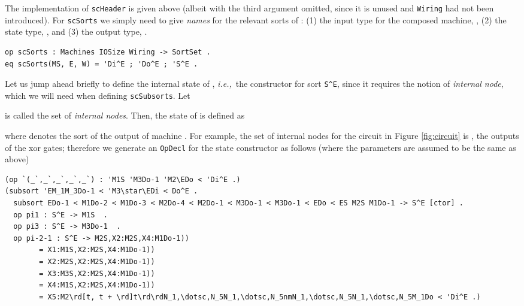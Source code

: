 \documentclass[copyright,creativecommons]{eptcs}
\newcommand{\ie}{\textit{i.e.,}}
\DeclareMathOperator{\rd}{rd}
\begin{document}
The implementation of {\tt scHeader} is given above (albeit with the third
argument omitted, since it is unused and {\tt Wiring} had not been introduced).
For {\tt scSorts} we simply need to give \emph{names} for the relevant sorts of
: (1) the input type for the composed machine, , (2) the state
type, , and (3) the output type, .

\begin{center}
\begin{small}
\begin{boxedminipage}{0.60\textwidth}
\begin{verbatim}
op scSorts : Machines IOSize Wiring -> SortSet .
eq scSorts(MS, E, W) = 'Di^E ; 'Do^E ; 'S^E .
\end{verbatim}
\end{boxedminipage}
\end{small}
\end{center}

Let us jump ahead briefly to define the internal state of , \ie\ the
constructor for sort {\tt S\^{}E}, since it requires the notion of
\emph{internal node}, which we will need when defining {\tt scSubsorts}.
Let 

 is called the set of \emph{internal nodes}. Then, the state of  is
defined as

where  denotes the sort of the  output of machine .
For example, the set of internal nodes for the circuit in Figure
\ref{fig:circuit} is , the outputs of the xor gates;
therefore we generate an {\tt OpDecl} for the state constructor as follows
(where the parameters are assumed to be the same as above)

\begin{center}
\begin{small}
\begin{boxedminipage}{0.95\textwidth}
\begin{verbatim}
(op `(_`,_`,_`,_`,_`) : 'M1S 'M3Do-1 'M2\EDo < 'Di^E .)
(subsort 'EM_1M_3Do-1 < 'M3\star\EDi < Do^E .
  subsort EDo-1 < M1Do-2 < M1Do-3 < M2Do-4 < M2Do-1 < M3Do-1 < M3Do-1 < EDo < ES M2S M1Do-1 -> S^E [ctor] .
  op pi1 : S^E -> M1S  .
  op pi3 : S^E -> M3Do-1  .
  op pi-2-1 : S^E -> M2S,X2:M2S,X4:M1Do-1)) 
        = X1:M1S,X2:M2S,X4:M1Do-1)) 
        = X2:M2S,X2:M2S,X4:M1Do-1)) 
        = X3:M3S,X2:M2S,X4:M1Do-1))
        = X4:M1S,X2:M2S,X4:M1Do-1)) 
        = X5:M2\rd[t, t + \rd]t\rd\rdN_1,\dotsc,N_5N_1,\dotsc,N_5nmN_1,\dotsc,N_5N_1,\dotsc,N_5M_1Do < 'Di^E .)
\end{verbatim}
\end{boxedminipage}
\end{small}
\end{center}
\end{document}
